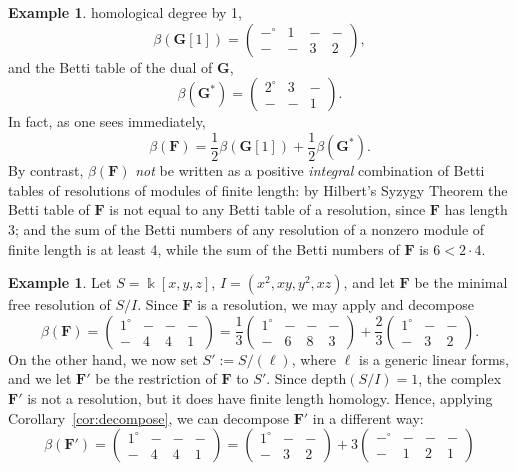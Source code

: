 \documentclass[12pt]{amsart}
\theoremstyle{definition}
\newtheorem{example}[lemma]{Example}
\theoremstyle{remark}
\newcommand{\kk}{\Bbbk}
\newcommand{\bG}{\mathbf{G}}
\newcommand{\FF}{\mathbf{F}}
\newcommand{\zp}{\circ}
\begin{document}
\begin{example}
homological degree by 1,
$$
\beta(\bG[1]) =\begin{pmatrix} -^{\circ}&1&-&-\\-&-&3&2\end{pmatrix},
$$
and the Betti table of the dual of $\bG$, 
$$
\beta(\bG^{*}) = \begin{pmatrix} 2^\circ&3&-\\-&-&1\end{pmatrix}.
$$
In fact, as one sees immediately,
\[
\beta(\FF)=
\frac{1}{2}\beta(\bG[1])
+
\frac{1}{2}\beta(\bG^{*}).
\]
By contrast, $\beta(\FF)$ \emph{not} be written as a positive \emph{integral} combination of Betti tables of resolutions of modules of finite length: by Hilbert's Syzygy Theorem the Betti table of $\FF$  is not equal to any Betti table of a resolution, since $\FF$ has length 3; and the sum of the Betti numbers of any resolution of a nonzero module of finite length is at least 4, while the sum of the Betti numbers of $\FF$ is $6<2\cdot 4$.
\end{example}

\begin{example}
Let $S=\kk[x,y,z]$, $I=(x^2,xy,y^2,xz)$, and let $\FF$ be the minimal free resolution of $S/I$.  Since $\FF$ is a resolution, we may apply \cite[Theorem~]{boij-sod2} and decompose
\[
\beta(\FF)=\begin{pmatrix}
1^\zp&-&-&-\\
-&4&4&1
\end{pmatrix}
=
\frac{1}{3}
\begin{pmatrix}
1^\zp&-&-&-\\
-&6&8&3
\end{pmatrix}
+\frac{2}{3}
\begin{pmatrix}
1^\zp&-&-\\
-&3&2
\end{pmatrix}.
\]
On the other hand, we now set $S':=S/(\ell)$, where $\ell$ is a generic linear forms, and we let $\FF'$ be the restriction of $\FF$ to $S'$.  Since $\text{depth}(S/I)=1$, the complex $\FF'$ is not a resolution, but it does have finite length homology.  Hence, applying Corollary~\ref{cor:decompose}, we can decompose $\FF'$ in a different way:
\[
\beta(\FF')=
\begin{pmatrix}
1^\zp&-&-&-\\
-&4&4&1
\end{pmatrix}
=\begin{pmatrix}1^\zp&-&-\\-&3&2\end{pmatrix}
+
3\begin{pmatrix}
-^\zp&-&-&-\\
-&1&2&1
\end{pmatrix}
\] 
\end{example}
\end{document}

